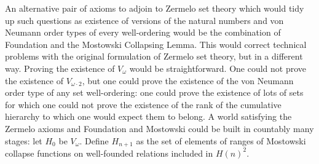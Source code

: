 \documentclass[12pt]{book}
\begin{document}
An alternative pair of axioms to adjoin to Zermelo set theory which would tidy up such questions as existence of versions of the natural numbers and von Neumann order types of every well-ordering would be the combination of Foundation and the Mostowski Collapsing Lemma.  This would correct technical problems with the original formulation of Zermelo set theory, but in a different way.  Proving the existence of $V_{\omega}$ would be straightforward.  One could not prove the existence of $V_{\omega\cdot 2}$, but one could prove the existence of the von Neumann order type of any set well-ordering:  one could prove the existence of lots of sets for which one could not prove the existence of the rank of the cumulative hierarchy to which one would expect them to belong.  A world satisfying the Zermelo axioms and Foundation and Mostowski could be built in countably many stages:  let $H_0$ be $V_{\omega}$.  Define $H_{n+1}$ as the set of elements of ranges of Mostowski collapse functions on well-founded relations included in  $H(n)^2$.

\newpage
\end{document}
